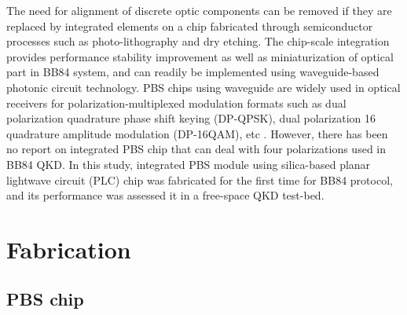\documentclass[letterpaper, 10pt]{article}
\begin{document}
The need for alignment of discrete optic components can be removed if they are replaced by integrated elements on a chip
fabricated through semiconductor processes such as photo-lithography and dry etching.
The chip-scale integration provides performance stability improvement as well as miniaturization of optical part in BB84 system, and can readily be implemented using waveguide-based photonic circuit technology.
PBS chips using waveguide are widely used in optical receivers for polarization-multiplexed modulation formats such as dual polarization quadrature phase shift keying (DP-QPSK), dual polarization 16 quadrature amplitude modulation (DP-16QAM), etc  \cite{Lee:2016bg,PoDong:2014kj}.
However, there has been no report on integrated PBS chip that can deal with four polarizations used in BB84 QKD.
In this study, integrated PBS module using  silica-based planar lightwave circuit (PLC) chip was fabricated for the first time for BB84 protocol, and its performance was assessed it in a free-space QKD test-bed.

\section{Fabrication}
\subsection{PBS chip}
\end{document}
